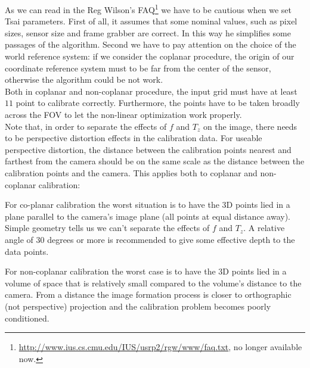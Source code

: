 As we can read in the Reg Wilson's FAQ\footnote{\url{http://www.ius.cs.cmu.edu/IUS/usrp2/rgw/www/faq.txt}, no longer available now.} we have to be cautious when we set Tsai parameters. First of all, it assumes that some nominal values, such as pixel sizes, sensor size and frame grabber are correct. In this way he simplifies some passages of the algorithm. Second we have to pay attention on the choice of the world reference system: if we consider the coplanar procedure, the origin of our coordinate reference system must to be far from the center of the sensor, otherwise the algorithm could be not work. \\
Both in coplanar and non-coplanar procedure, the input grid must have at least $11$ point to calibrate correctly. Furthermore, the points have to be taken broadly across the \acs{FOV} to let the non-linear optimization work properly. \\

Note that, in order to separate the effects of $f$ and $T_z$ on the image, there needs to be perspective distortion effects in the calibration data. For useable perspective distortion, the distance between the calibration points nearest and farthest from the camera should be on the same scale as the distance between the calibration points and the camera. This applies both to coplanar and non-coplanar calibration:

For co-planar calibration the worst situation is to have the 3D points lied in a plane parallel to the camera's image plane (all points at   equal distance away). Simple geometry tells us we can't separate the effects of $f$ and $T_z$. A relative angle of $30$ degrees or more is recommended to give some effective depth to the data points.

For non-coplanar calibration the worst case is to have the 3D points lied in a volume of space that is relatively small compared to the volume's distance to the camera. From a distance the image formation process is closer to orthographic (not perspective) projection and the calibration problem becomes poorly conditioned.


